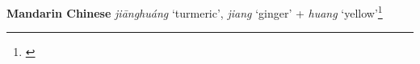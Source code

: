 \begin{etymology}\label{ety:jianghuang}
\textbf{Mandarin Chinese}  \textit{jiānghuáng} `turmeric', \textit{jiang} `ginger' + \textit{huang} `yellow'\footnote{\textcite[856]{kleeman_oxford_2010}}
\end{etymology}